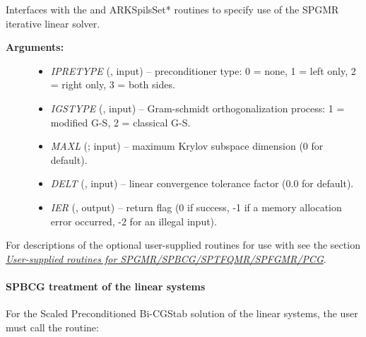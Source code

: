 \documentclass[letterpaper,10pt,english]{sphinxmanual}
\begin{document}
\begin{fulllineitems}
\label{f_interface/Usage:f/_/FARKSPGMR}
Interfaces with the {\hyperref[c_interface/User_callable:ARKSpgmr]{}} and ARKSpilsSet* routines
to specify use of the SPGMR iterative linear solver.
\begin{description}
\item[{\textbf{Arguments:}}] \leavevmode\begin{itemize}
\item {} 
\emph{IPRETYPE} (, input) -- preconditioner type: 0 = none,
1 = left only, 2 = right only, 3 = both sides.

\item {} 
\emph{IGSTYPE} (, input) -- Gram-schmidt orthogonalization
process: 1 = modified G-S, 2 = classical G-S.

\item {} 
\emph{MAXL} (; input) -- maximum Krylov subspace dimension
(0 for default).

\item {} 
\emph{DELT} (, input) -- linear convergence tolerance
factor (0.0 for default).

\item {} 
\emph{IER} (, output) -- return flag (0 if success, -1 if a
memory allocation error occurred, -2 for an illegal input).

\end{itemize}

\end{description}

\end{fulllineitems}


For descriptions of the optional user-supplied routines for use with
{\hyperref[f_interface/Usage:f/_/FARKSPGMR]{}} see the section {\hyperref[f_interface/Usage:finterface-spilsusersupplied]{\emph{User-supplied routines for SPGMR/SPBCG/SPTFQMR/SPFGMR/PCG}}}.


\paragraph{SPBCG treatment of the linear systems}
\label{f_interface/Usage:spbcg-treatment-of-the-linear-systems}
For the Scaled Preconditioned Bi-CGStab solution of the linear systems,
the user must call the {\hyperref[f_interface/Usage:f/_/FARKSPBCG]{}} routine:
\end{document}
